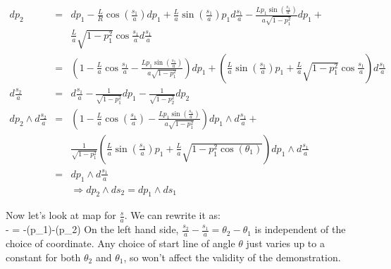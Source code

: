 {\begin{eqnarray}
dp_{2}&=&dp_{1}-\frac{L}{R}\cos(\frac{s_{1}}{a})dp_{1}+\frac{L}{a}\sin(\frac{s_{1}}{a})p_{1}d\frac{s_{1}}{a}-
\frac{Lp_{1}\sin(\frac{s_{1}}{a})}{a\sqrt{1-p_{1}^{2}}}dp_{1}+
\\\nonumber&&\frac{L}{a}\sqrt{1-p_{1}^{2}}\cos{\frac{s_{1}}{a}}d\frac{s_{1}}{a}\\\nonumber
&=&(1-\frac{L}{a}\cos{\frac{s_{1}}{a}}-\frac{Lp_{1}\sin(\frac{s_{1}}{a})}{a\sqrt{1-p_{1}^{2}}})dp_{1}
+(\frac{L}{a}\sin(\frac{s_{1}}{a})p_{1}+\frac{L}{a}\sqrt{1-p_{1}^{2}}\cos{\frac{s_{1}}{a}})d\frac{s_{1}}{a}\\\nonumber
d\frac{s_{2}}{a}&=&d\frac{s_{1}}{a}-\frac{1}{\sqrt{1-p_{1}^{2}}}dp_{1}-\frac{1}{\sqrt{1-p_{2}^{2}}}dp_{2}\\\nonumber
dp_{2}\wedge d\frac{s_{2}}{a}&=& (1-\frac{L}{a}\cos(\frac{s_{1}}{a})-\frac{Lp_{1}\sin(\frac{s_{1}}{a})}{a\sqrt{1-p_{1}^{2}}})dp_{1}{\wedge}d\frac{s_{1}}{a}+\\&&\frac{1}{\sqrt{1-p_{1}^{2}}}(\frac{L}{a}\sin(\frac{s_{1}}{a})p_{1}
+\frac{L}{a}\sqrt{1-p_{1}^{2}\cos(\theta_{1})})dp_{1}\wedge d\frac{s_{1}}{a}\\\nonumber
&=&dp_{1}\wedge d\frac{s_{1}}{a}\\
&&\Rightarrow dp_{2}\wedge ds_{2} = dp_{1}\wedge ds_{1}
\end{eqnarray}

Now let's look at map for $\frac{s}{a}$. We can rewrite it as:
\\ \beq {} -  = \pi-\arcsin(p_{1})-\arcsin(p_{2}) \eeq
On the left hand side, $\frac{s_{2}}{a} - \frac{s_{1}}{a} = \theta_{2}-\theta_{1}$ is independent of the choice of coordinate. Any choice of start line of angle $\theta$ just varies up to a constant for both $\theta_{2}$ and $\theta_{1}$, so won't affect the validity of the demonstration.

}
